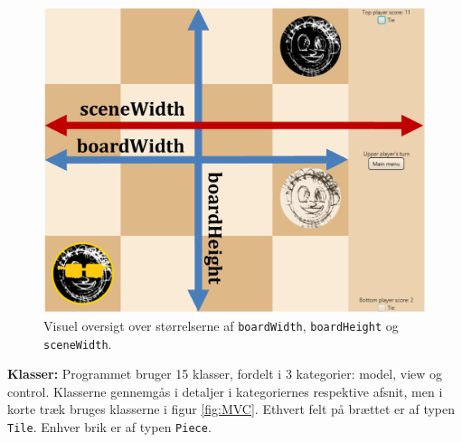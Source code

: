  \begin{figure}[H]
        \centering
        \includegraphics[width = 0.6  \textwidth]{Figurer/heightWidth.pdf}
        \caption{Visuel oversigt over størrelserne af \texttt{boardWidth}, \texttt{boardHeight} og \texttt{sceneWidth}.}
        \label{fig:heightWidth}
    \end{figure}

\textbf{Klasser:} Programmet bruger 15 klasser, fordelt i 3 kategorier: model, view og control. Klasserne gennemgås i detaljer i kategoriernes respektive afsnit, men i korte træk bruges klasserne i figur \ref{fig:MVC}. Ethvert felt på brættet er af typen \texttt{Tile}. Enhver brik er af typen \texttt{Piece}.

